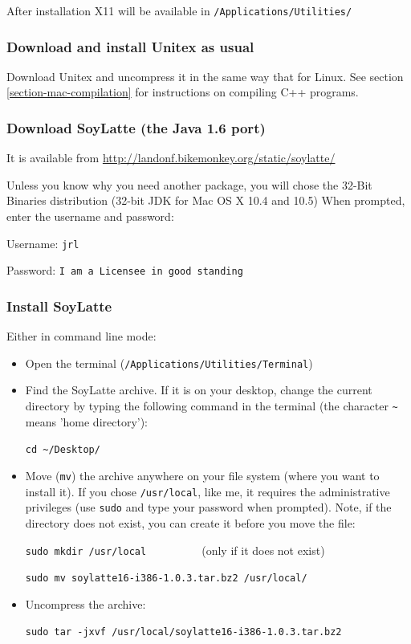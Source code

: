 \bigskip
\noindent After installation X11 will be available in
\verb+/Applications/Utilities/+


\subsubsection{Download and install Unitex as usual}
\noindent Download Unitex and uncompress it in the same way that for Linux.
See section \ref{section-mac-compilation} for instructions on compiling
C++ programs.


\subsubsection{Download SoyLatte (the Java 1.6 port)} 
\noindent It is available from
\url{http://landonf.bikemonkey.org/static/soylatte/} 

\bigskip
\noindent Unless you know why you need another package, you will chose 
the 32-Bit Binaries distribution (32-bit JDK for Mac OS X 10.4 and 10.5) 
When prompted, enter the username and password: 

\bigskip
Username: \verb+jrl+

Password: \verb+I am a Licensee in good standing+


\subsubsection{Install SoyLatte}
\noindent Either in command line mode:
\begin{itemize}
    \item Open the terminal (\verb+/Applications/Utilities/Terminal+)
    \item Find the SoyLatte archive. If it is on your desktop, change the
    current directory by typing the following command in the terminal 
    (the character \verb+~+ means 'home directory'): 
    
    \bigskip
    \verb+cd ~/Desktop/+
    
    \item Move (\verb+mv+) the archive anywhere on your file system (where you
    want to install it). If you chose \verb+/usr/local+, like me, it requires the
    administrative privileges (use \verb+sudo+ and type your password when
    prompted). Note, if the directory does not exist, you can create it 
    before you move the file:
    
    \bigskip
    \verb+sudo mkdir /usr/local         + (only if it does not exist)
    
    \verb+sudo mv soylatte16-i386-1.0.3.tar.bz2 /usr/local/+

    \item Uncompress the archive:
    
    \bigskip
    \verb+sudo tar -jxvf /usr/local/soylatte16-i386-1.0.3.tar.bz2+ 
\end{itemize}

